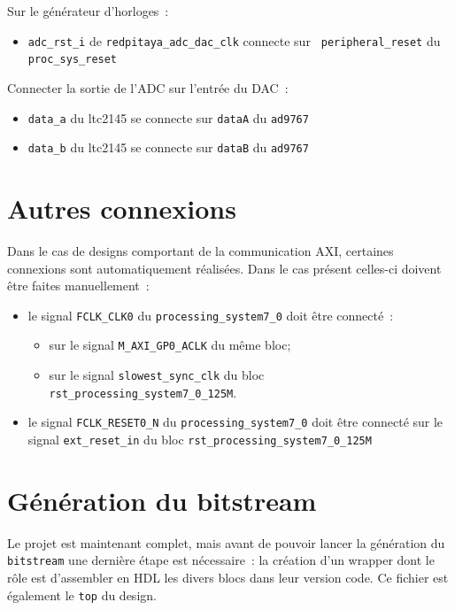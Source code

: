 \documentclass[12pt,oneside]{article}
\begin{document}
Sur le g\'en\'erateur d'horloges~:
\begin{itemize}
\item {\tt adc\_rst\_i} de {\tt redpitaya\_adc\_dac\_clk} connecte sur {\tt 
peripheral\_reset} du {\tt proc\_sys\_reset}
\end{itemize}

Connecter la sortie de l'ADC sur l'entr\'ee du DAC~:
\begin{itemize}
\item {\tt data\_a} du ltc2145 se connecte sur {\tt dataA} du {\tt ad9767}
\item {\tt data\_b} du ltc2145 se connecte sur {\tt dataB} du {\tt ad9767}
\end{itemize}

\section{Autres connexions}

Dans le cas de designs comportant de la communication AXI, certaines connexions
sont automatiquement r\'ealis\'ees. Dans le cas pr\'esent celles-ci doivent \^etre
faites manuellement~:
\begin{itemize}
\item le signal {\tt FCLK\_CLK0} du {\tt processing\_system7\_0} doit \^etre
connect\'e~:
	\begin{itemize}
	\item sur le signal {\tt M\_AXI\_GP0\_ACLK} du m\^eme bloc;
	\item sur le signal {\tt slowest\_sync\_clk} du bloc {\tt
	rst\_processing\_system7\_0\_125M}.
	\end{itemize}
\item le signal {\tt FCLK\_RESET0\_N} du {\tt processing\_system7\_0} doit \^etre
connect\'e sur le 
signal {\tt ext\_reset\_in} du bloc {\tt rst\_processing\_system7\_0\_125M}
\end{itemize}

\section{G\'en\'eration du bitstream}

Le projet est maintenant complet, mais avant de pouvoir lancer la
g\'en\'eration du {\tt bitstream} une derni\`ere \'etape est n\'ecessaire~: la
cr\'eation d'un wrapper dont le r\^ole est d'assembler en HDL les divers blocs
dans leur version code. Ce fichier est \'egalement le {\tt top} du design.
\end{document}
